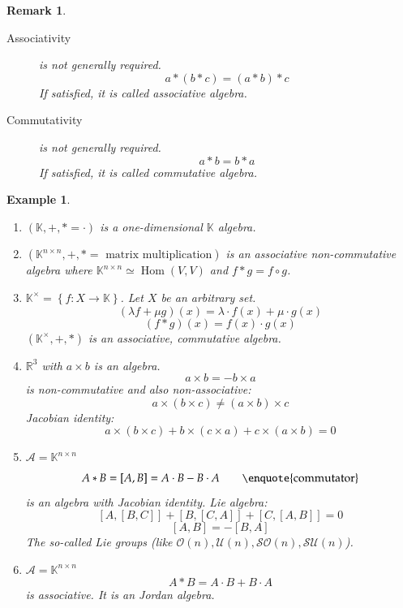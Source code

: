 \documentclass[a4paper]{article}
\newcounter{lecref}[section]
\numberwithin{lecref}{section}
\newtheorem{example}[lecref]{Example}
\newtheorem{remark}[lecref]{Remark}
\newcommand{\set}[1]{\left\{#1\right\}}
\DeclareMathOperator{\Hom}{Hom}
\begin{document}
\begin{remark} %
  \begin{description}
    \item[Associativity] is not generally required.
      \[ a * (b * c) = (a * b) * c \]
      If satisfied, it is called \emph{associative algebra}.
    \item[Commutativity] is not generally required.
      \[ a * b = b * a \]
      If satisfied, it is called \emph{commutative algebra}.
  \end{description}
\end{remark}

\begin{example} %
  \begin{enumerate}
    \item $(\mathbb K, +, * = \cdot)$ is a one-dimensional $\mathbb K$ algebra.
    \item $(\mathbb K^{n \times n}, +, * = \text{ matrix multiplication})$ is an associative non-commutative algebra
      where $\mathbb K^{n \times n} \simeq \Hom(V, V)$ and $f * g = f \circ g$.
    \item $\mathbb K^\times = \set{f: X \to \mathbb K}$. Let $X$ be an arbitrary set.
      \[ (\lambda f + \mu g)(x) = \lambda \cdot f(x) + \mu \cdot g(x) \]
      \[ (f * g)(x) = f(x) \cdot g(x) \]
      $(\mathbb K^\times, +, *)$ is an associative, commutative algebra.
    \item $\mathbb R^3$ with $a \times b$ is an algebra.
      \[ a \times b = -b \times a \]
      is non-commutative and also non-associative:
      \[ a \times (b \times c) \neq (a \times b) \times c \]
      Jacobian identity:
      \[ a \times (b \times c) + b \times (c \times a) + c \times (a \times b) = 0 \]
    \item $\mathcal A = \mathbb K^{n\times n}$
      \[ A * B = [A,B] = A \cdot B - B \cdot A \qquad \text{\enquote{commutator}} \]
      is an algebra with Jacobian identity. Lie algebra:
      \[ [A, [B,C]] + [B, [C,A]] + [C, [A,B]] = 0 \]
      \[ [A,B] = -[B,A] \]
      The so-called Lie groups (like $\mathcal O(n), \mathcal U(n), \mathcal{SO}(n), \mathcal{SU}(n)$).
    \item
      $\mathcal A = \mathbb K^{n\times n}$
      \[ A * B = A \cdot B + B \cdot A \]
      is associative. It is an Jordan algebra.
  \end{enumerate}
\end{example}
\end{document}
